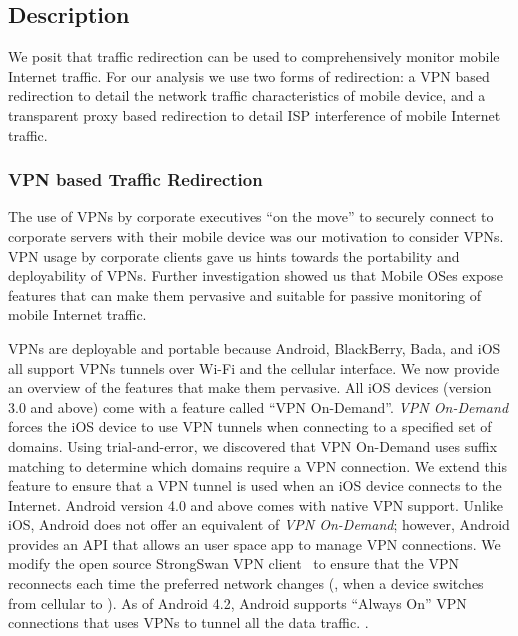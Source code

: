 \subsection{Description}
\label{sec:description}

We posit that traffic redirection can be used to comprehensively monitor mobile Internet traffic.
For our analysis we use two forms of redirection: a VPN based redirection to detail the network traffic characteristics of mobile device, and a transparent proxy based redirection to detail ISP interference of mobile Internet traffic. 

\subsubsection{VPN based Traffic Redirection} 
The use of VPNs by corporate executives ``on the move'' to securely connect to corporate servers with their mobile device was our motivation to consider VPNs.  
VPN usage by corporate clients gave us hints towards the portability and deployability of VPNs.
Further investigation showed us that Mobile OSes expose features that can make them pervasive and suitable for passive monitoring of mobile Internet traffic.  

VPNs are deployable and portable because Android, BlackBerry, Bada, and iOS all support VPNs tunnels over Wi-Fi and the cellular interface.
We now provide an overview of the features that make them pervasive. 
All iOS devices (version 3.0 and above) come with a feature called ``VPN On-Demand''. 
\emph{VPN On-Demand} forces the iOS device to use VPN tunnels when connecting to a specified set of domains. 
Using trial-and-error, we discovered that VPN On-Demand uses suffix matching to determine which domains require a VPN connection. 
We extend this feature to ensure that a VPN tunnel is used when an iOS device connects to the Internet.
Android version 4.0 and above comes with native VPN support. 
Unlike iOS, Android does not offer an equivalent of \emph{VPN On-Demand}; however, Android provides an API that allows an user space app to manage VPN connections. 
We modify the open source StrongSwan VPN client~\cite{strongswanclient} to ensure that the VPN reconnects each time the preferred network changes (\eg, when a device switches from cellular to \wifi). 
As of Android 4.2, Android supports ``Always On'' VPN connections that uses VPNs to tunnel all the data traffic. 
.

